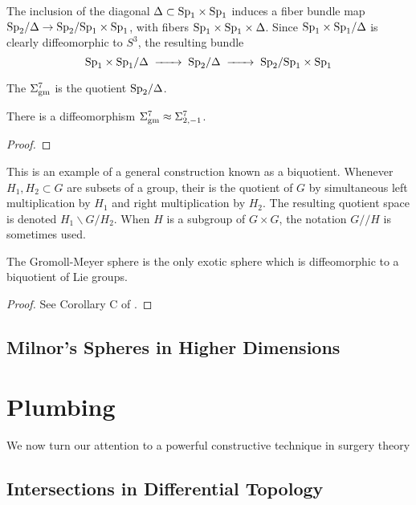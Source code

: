 The inclusion of the diagonal $\Delta \subset \mathrm{Sp}_1\times \mathrm{Sp}_1$ induces a fiber bundle map $\mathrm{Sp}_2/\Delta \to \mathrm{Sp}_2/\mathrm{Sp}_1\times \mathrm{Sp}_1$, with fibers $\mathrm{Sp}_1\times \mathrm{Sp}_1\times \Delta$. Since $\mathrm{Sp}_1\times \mathrm{Sp}_1/\Delta$ is clearly diffeomorphic to $S^3$, the resulting bundle
\[
		\Sp_1\times\Sp_1/\Delta \lkxto \Sp_2/\Delta \lkxto \Sp_2/\Sp_1\times \Sp_1
\]

\begin{definition}
	The  $\Sigma^7_{\mathrm{gm}}$ is the quotient $\mathrm{Sp}_2/\Delta$.
\end{definition}

\begin{proposition}
	There is a diffeomorphism $\Sigma^7_{\mathrm{gm}} \approx \Sigma^7_{2,-1}$.
\end{proposition}
\begin{proof}
\end{proof}


This is an example of a general construction known as a biquotient. Whenever $H_1,H_2\subset G$ are subsets of a group, their  is the quotient of $G$ by simultaneous left multiplication by $H_1$ and right multiplication by $H_2$. The resulting quotient space is denoted $H_1\backslash G/H_2$. When $H$ is a subgroup of $G\times G$, the notation $G/\!/H$ is sometimes used.

\begin{theorem}
	The Gromoll-Meyer sphere is the only exotic sphere which is diffeomorphic to a biquotient of Lie groups.
\end{theorem}
\begin{proof}
	See Corollary C of \cite{KZ2004biquotients}.
\end{proof}

\subsection{Milnor's Spheres in Higher Dimensions}

\pagebreak
\section{Plumbing}\label{sec:plumbing}

We now turn our attention to a powerful constructive technique in surgery theory


\subsection{Intersections in Differential Topology}\label{sec:differential-topology-intersections}

